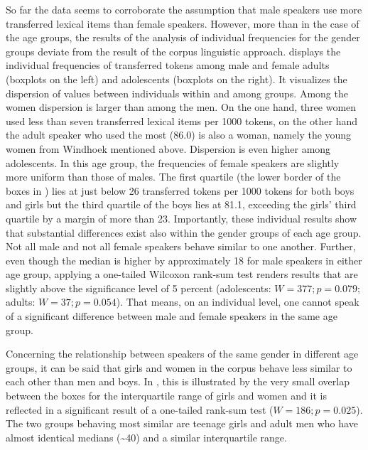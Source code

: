 \documentclass[output=paper]{langsci/langscibook}
\begin{document}
So far the data seems to corroborate the assumption that male speakers use more transferred lexical items than female speakers. However, more than in the case of the age groups, the results of the analysis of individual frequencies for the gender groups deviate from the result of the corpus linguistic approach.  displays the individual frequencies of transferred tokens among male and female adults (boxplots on the left) and adolescents (boxplots on the right). It visualizes the dispersion of values between individuals within and among groups. Among the women dispersion is larger than among the men. On the one hand, three women used less than seven transferred lexical items per 1000 tokens, on the other hand the adult speaker who used the most (86.0) is also a woman, namely the young women from Windhoek mentioned above. Dispersion is even higher among adolescents. In this age group, the frequencies of female speakers are slightly more uniform than those of males. The first quartile (the lower border of the boxes in ) lies at just below 26 transferred tokens per 1000 tokens for both boys and girls but the third quartile of the boys lies at 81.1, exceeding the girls’ third quartile by a margin of more than 23. Importantly, these individual results show that substantial differences exist also within the gender groups of each age group. Not all male and not all female speakers behave similar to one another. Further, even though the median is higher by approximately 18 for male speakers in either age group, applying a one-tailed Wilcoxon rank-sum test renders results that are slightly above the significance level of 5 percent (adolescents: $W = 377; p = 0.079$; adults: $W = 37; p = 0.054$). That means, on an individual level, one cannot speak of a significant difference between male and female speakers in the same age group.

Concerning the relationship between speakers of the same gender in different age groups, it can be said that girls and women in the corpus behave less similar to each other than men and boys. In , this is illustrated by the very small overlap between the boxes for the interquartile range of girls and women and it is reflected in a significant result of a one-tailed rank-sum test ($W = 186; p = 0.025$). The two groups behaving most similar are teenage girls and adult men who have almost identical medians ({\textasciitilde}40) and a similar interquartile range.
\end{document}
